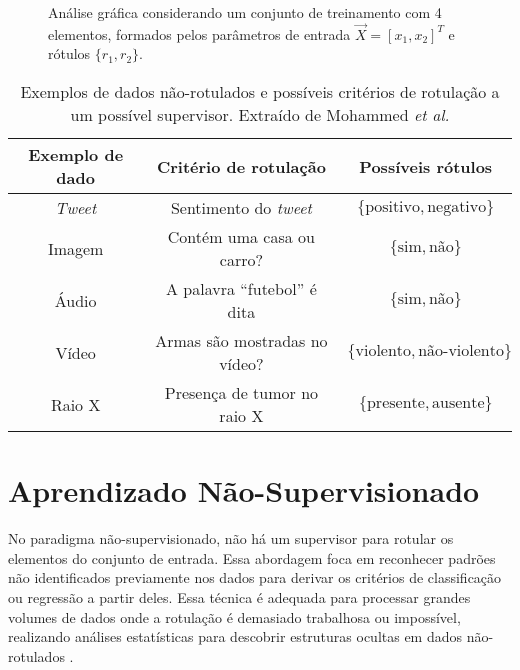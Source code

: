 \documentclass[
	12pt,				%
	openright,			%
	oneside,			%
	a4paper,			%
	tccpreliminar,			%
	]{ABNT-DC-UEL}
\begin{document}
\begin{figure}[hbt]
    \centering
    \caption{Análise gráfica considerando um conjunto de treinamento com 4 elementos, formados pelos parâmetros de entrada $\Vec{X} = [x_1,x_2]^T$ e rótulos $\{r_1, r_2\}$.}
    \label{fig:plot-supervisionado}
\end{figure}

\begin{table}[htb]
    \centering
    \begin{tabular}{c|c|c}
        Exemplo de dado & Critério de rotulação & Possíveis rótulos \\ \hline
        \textit{Tweet} & Sentimento do \textit{tweet} & $\{\text{positivo},\text{negativo}\}$ \\
        Imagem & Contém uma casa ou carro? & $\{\text{sim},\text{não}\}$ \\
        Áudio & A palavra ``futebol'' é dita & $\{\text{sim},\text{não}\}$ \\
        Vídeo & Armas são mostradas no vídeo? & $\{\text{violento},\text{não-violento}\}$ \\
        Raio X & Presença de tumor no raio X & $\{\text{presente},\text{ausente}\}$
    \end{tabular}
    \caption{Exemplos de dados não-rotulados e possíveis critérios de rotulação a um possível supervisor. Extraído de Mohammed \textit{et al.} \cite{mohammed:16}}
    \label{tab:rotulos}
\end{table}

\section{Aprendizado Não-Supervisionado}

No paradigma não-supervisionado, não há um supervisor para rotular os elementos do conjunto de entrada. Essa abordagem foca em reconhecer padrões não identificados previamente nos dados para derivar os critérios de classificação ou regressão a partir deles. Essa técnica é adequada para processar grandes volumes de dados onde a rotulação é demasiado trabalhosa ou impossível, realizando análises estatísticas para descobrir estruturas ocultas em dados não-rotulados \cite{mohammed:16}. 
\end{document}
